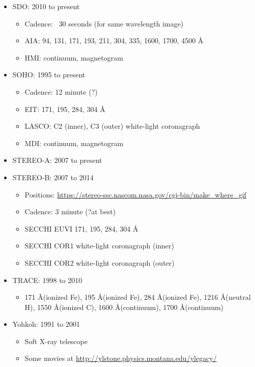 \documentclass[11pt]{article}%
\begin{document}
\begin{itemize}
\item SDO: 2010 to present
    \begin{itemize}
    \item Cadence: ~30 seconds (for same wavelength image)
    \item AIA: 94, 131, 171, 193, 211, 304, 335, 1600, 1700, 4500 \AA
    \item HMI: continuum, magnetogram
    \end{itemize}
\item SOHO: 1995 to present
    \begin{itemize}
    \item Cadence: 12 minute (?)
    \item EIT: 171, 195, 284, 304 \AA
    \item LASCO: C2 (inner), C3 (outer) white-light coronagraph
    \item MDI: continuum, magnetogram
    \end{itemize}
\item STEREO-A: 2007 to present
\item STEREO-B: 2007 to 2014
    \begin{itemize}
    \item Positions: \url{https://stereo-ssc.nascom.nasa.gov/cgi-bin/make\_where\_gif}
    \item Cadence: 3 minute (?at best)
    \item SECCHI EUVI 171, 195, 284, 304 \AA
    \item SECCHI COR1 white-light coronagraph (inner)
    \item SECCHI COR2 white-light coronagraph (outer)
    \end{itemize}
\item TRACE: 1998 to 2010
    \begin{itemize}
    \item 171 \AA (ionized Fe), 195  \AA (ionized Fe), 284 \AA (ionized Fe),
        1216 \AA (neutral H), 1550 \AA (ionized C), 1600  \AA (continuum),
        1700 \AA (continuum)
    \end{itemize}
\item Yohkoh: 1991 to 2001
    \begin{itemize}
    \item Soft X-ray telescope
    \item Some movies at \url{http://ylstone.physics.montana.edu/ylegacy/}
    \end{itemize}

\end{itemize}
\end{document}

